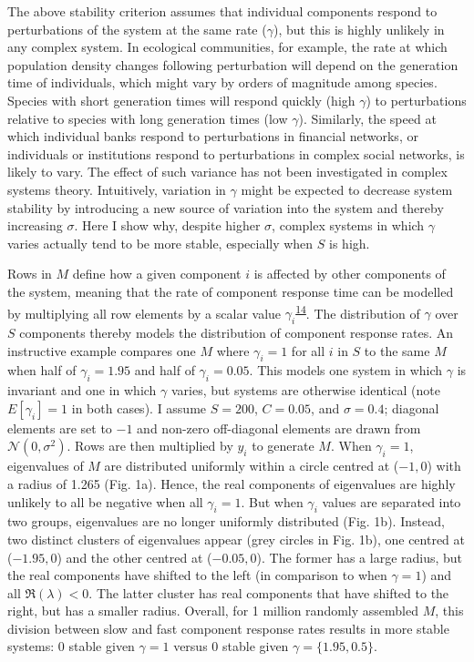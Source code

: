 \documentclass[]{article}
\begin{document}
The above stability criterion assumes that individual components respond
to perturbations of the system at the same rate (\(\gamma\)), but this
is highly unlikely in any complex system. In ecological communities, for
example, the rate at which population density changes following
perturbation will depend on the generation time of individuals, which
might vary by orders of magnitude among species. Species with short
generation times will respond quickly (high \(\gamma\)) to perturbations
relative to species with long generation times (low \(\gamma\)).
Similarly, the speed at which individual banks respond to perturbations
in financial networks, or individuals or institutions respond to
perturbations in complex social networks, is likely to vary. The effect
of such variance has not been investigated in complex systems theory.
Intuitively, variation in \(\gamma\) might be expected to decrease
system stability by introducing a new source of variation into the
system and thereby increasing \(\sigma\). Here I show why, despite
higher \(\sigma\), complex systems in which \(\gamma\) varies actually
tend to be more stable, especially when \(S\) is high.

Rows in \(M\) define how a given component \(i\) is affected by other
components of the system, meaning that the rate of component response
time can be modelled by multiplying all row elements by a scalar value
\(\gamma_{i}\)\textsuperscript{\protect\hyperlink{ref-Patel2018}{14}}.
The distribution of \(\gamma\) over \(S\) components thereby models the
distribution of component response rates. An instructive example
compares one \(M\) where \(\gamma_{i} = 1\) for all \(i\) in \(S\) to
the same \(M\) when half of \(\gamma_{i} = 1.95\) and half of
\(\gamma_{i} = 0.05\). This models one system in which \(\gamma\) is
invariant and one in which \(\gamma\) varies, but systems are otherwise
identical (note \(E[\gamma_{i}] = 1\) in both cases). I assume
\(S = 200\), \(C = 0.05\), and \(\sigma = 0.4\); diagonal elements are
set to \(-1\) and non-zero off-diagonal elements are drawn from
\(\mathcal{N}(0, \sigma^{2})\). Rows are then multiplied by \(y_{i}\) to
generate \(M\). When \(\gamma_{i} = 1\), eigenvalues of \(M\) are
distributed uniformly within a circle centred at (\(-1, 0\)) with a
radius of 1.265 (Fig. 1a). Hence, the real components of eigenvalues are
highly unlikely to all be negative when all \(\gamma_{i} = 1\). But when
\(\gamma_{i}\) values are separated into two groups, eigenvalues are no
longer uniformly distributed (Fig. 1b). Instead, two distinct clusters
of eigenvalues appear (grey circles in Fig. 1b), one centred at
(\(-1.95, 0\)) and the other centred at (\(-0.05, 0\)). The former has a
large radius, but the real components have shifted to the left (in
comparison to when \(\gamma = 1\)) and all \(\Re({\lambda}) < 0\). The
latter cluster has real components that have shifted to the right, but
has a smaller radius. Overall, for 1 million randomly assembled \(M\),
this division between slow and fast component response rates results in
more stable systems: 0 stable given \(\gamma = 1\) versus 0 stable given
\(\gamma = \{1.95, 0.5\}\).
\end{document}
